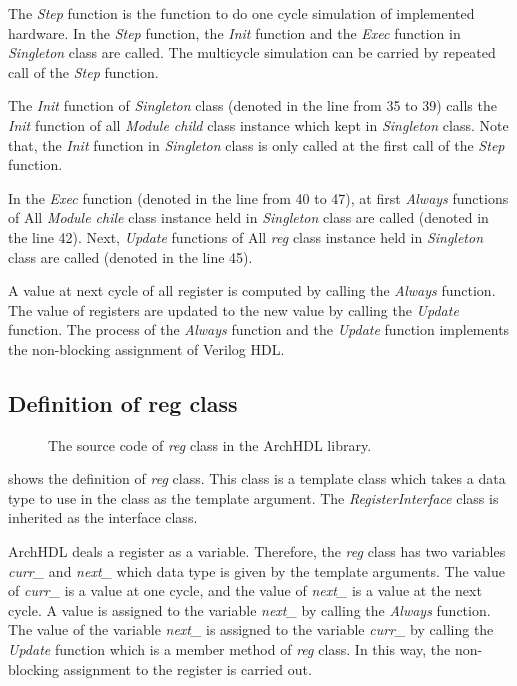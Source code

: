The \textit{Step} function is the function to do one cycle simulation of implemented hardware.
In the \textit{Step} function, the \textit{Init} function and the \textit{Exec} function in \textit{Singleton} class are called.
The multicycle simulation can be carried by repeated call of the \textit{Step} function.

The \textit{Init} function of \textit{Singleton} class (denoted in the line from 35 to 39) calls the \textit{Init} function of all \textit{Module child} class instance which kept in \textit{Singleton} class.
Note that, the \textit{Init} function in \textit{Singleton} class is only called at the first call of the \textit{Step} function.

In the \textit{Exec} function (denoted in the line from 40 to 47), at first \textit{Always} functions of All \textit{Module chile} class instance held in \textit{Singleton} class are called (denoted in the line 42).
Next, \textit{Update} functions of All \textit{reg} class instance held in \textit{Singleton} class are called (denoted in the line 45).

A value at next cycle of all register is computed by calling the \textit{Always} function.
The value of registers are updated to the new value by calling the \textit{Update} function.
The process of the \textit{Always} function and the \textit{Update} function implements the non-blocking assignment of Verilog HDL.

\subsection{Definition of reg class}

\begin{figure}[tp]
 
 \caption{The source code of \textit{reg} class in the ArchHDL library.}
 \label{src:reg}
\end{figure}

 shows the definition of \textit{reg} class.
This class is a template class which takes a data type to use in the class as the template argument.
The \textit{RegisterInterface} class is inherited as the interface class.

ArchHDL deals a register as a variable.
Therefore, the \textit{reg} class has two variables \textit{curr\_} and \textit{next\_} which data type is given by the template arguments.
The value of \textit{curr\_} is a value at one cycle, and the value of \textit{next\_} is a value at the next cycle.
A value is assigned to the variable \textit{next\_} by calling the \textit{Always} function.
The value of the variable \textit{next\_} is assigned to the variable \textit{curr\_} by calling the \textit{Update} function which is a member method of \textit{reg} class.
In this way, the non-blocking assignment to the register is carried out.

